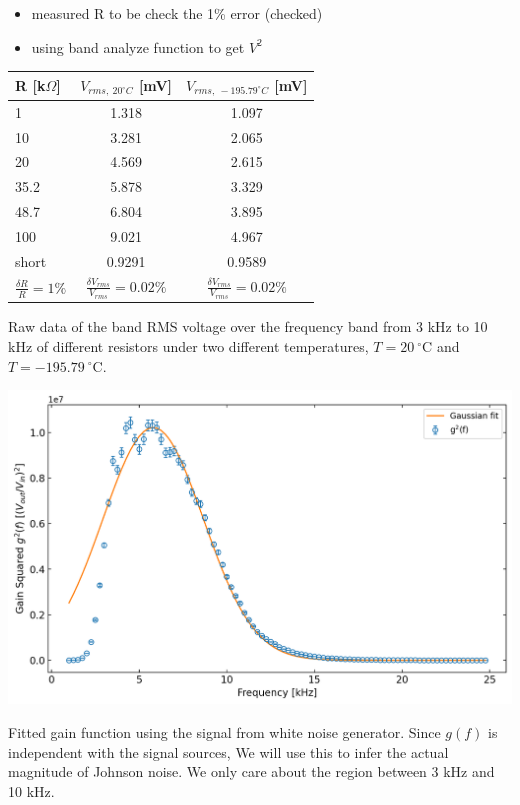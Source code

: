 \documentclass[a4paper]{tufte-handout}
\begin{document}
\begin{itemize}
    \item measured R to be check the 1\% error (checked)
    \item using band analyze function to get $V^2$
\end{itemize}
\begin{center}
    \centering
    \begin{tabular}{| l | c | c |}
    \hline
    R [k$\Omega$] & $V_{rms,~20^\circ C}$ [mV] & $V_{rms,~-195.79^\circ C}$ [mV]\\
    \hline
    \hline
    1 & 1.318 & 1.097\\
    10 & 3.281 & 2.065\\
    20 & 4.569 & 2.615\\
    35.2 & 5.878 & 3.329 \\
    48.7 & 6.804 & 3.895\\
    100 & 9.021 & 4.967\\
    short & 0.9291 & 0.9589 \\
    \hline
    $\frac{\delta R}{R} = 1\%$& $\frac{\delta V_{rms}}{V_{rms}} = 0.02\%$&$\frac{\delta V_{rms}}{V_{rms}} = 0.02\%$ \\
    \hline
    \end{tabular}

    
    \caption{Raw data of the band RMS voltage over the frequency band from 3 kHz to 10 kHz of different resistors under two different temperatures, $T=20~^\circ$C and $T=-195.79~^\circ$C.} \label{table:Vrms}
\end{center}

\begin{center}
    \includegraphics[width = 1\textwidth]{figures/day4_fit_gain.png}
    \caption{Fitted gain function using the signal from white noise generator. Since $g(f)$ is independent with the signal sources, We will use this to infer the actual magnitude of Johnson noise. We only care about the region between 3 kHz and 10 kHz.}\label{fig:gauss_fit}
\end{center}
\end{document}
